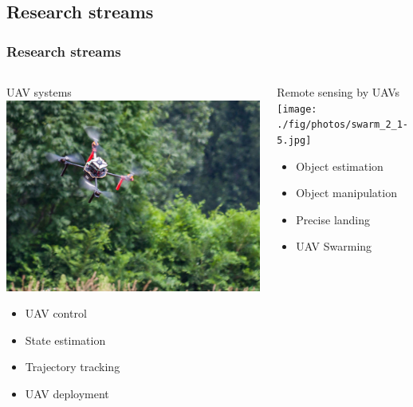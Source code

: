 \documentclass[aspectratio=169]{beamer}
\begin{document}
\subsection{Research streams}


\begin{frame}
\frametitle{Research streams}

\begin{columns}[c]


\begin{block}{UAV systems}
  \includegraphics[width=1.0\textwidth]{./fig/drona.jpg}
  \begin{itemize}
    \item UAV control
    \item State estimation
    \item Trajectory tracking
    \item UAV deployment
  \end{itemize}
\end{block}


\begin{block}{Remote sensing by UAVs}
  \texttt{[image: ./fig/photos/swarm\_2\_1-5.jpg]}
  \begin{itemize}
    \item Object estimation
    \item Object manipulation
    \item Precise landing
    \item UAV Swarming
  \end{itemize}
\end{block}


\end{columns}
\end{frame}
\end{document}
